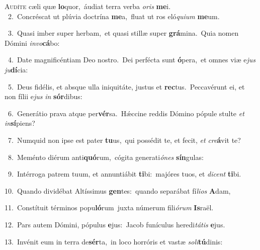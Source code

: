 \lettrine{\initial\textcolor{\initialcolor}{A}}{udíte} cæli quæ \textbf{lo}\-quor,~\star áudiat terra verba \textit{o}\-\textit{ris} \textbf{me}\-i.\\
{\numbfont\textcolor{\numbcolor}{~2.}}~Concréscat ut plúvia doctrína \textbf{me}\-a,~\star fluat ut ros eló\-\textit{qui}\-\textit{um} \textbf{me}\-um.\par
{\numbfont\textcolor{\numbcolor}{~3.}}~Quasi imber super herbam,~\dagger et quasi stillæ super \textbf{grá}\-mina.~\star Quia nomen Dómini \textit{in}\-\textit{vo}\textbf{cá}bo:\par
{\numbfont\textcolor{\numbcolor}{~4.}}~Date magnificéntiam Deo nostro.~\dagger Dei perfécta sunt \textbf{ó}\-pera,~\star et omnes viæ e\textit{jus} \textit{ju}\-\textbf{dí}cia:\par
{\numbfont\textcolor{\numbcolor}{~5.}}~Deus fidélis, et absque ulla iniquitáte, justus et \textbf{rec}\-tus.~\star Peccavérunt ei, et non fílii e\textit{jus} \textit{in} \textbf{sór}\-dibus:\par
{\numbfont\textcolor{\numbcolor}{~6.}}~Generátio prava atque per\-\textbf{vér}\-sa.~\star Hǽccine reddis Dómino pópule stulte \textit{et} \textit{in}\-\textbf{sí}piens?\par
{\numbfont\textcolor{\numbcolor}{~7.}}~Numquid non ipse est pater \textbf{tu}\-us,~\star qui possédit te, et fecit, \textit{et} \textit{cre}\-\textbf{á}vit te?\par
{\numbfont\textcolor{\numbcolor}{~8.}}~Meménto diérum anti\-\textbf{quó}\-rum,~\star cógita generati\-\textit{ó}\-\textit{nes} \textbf{sín}\-gulas:\par
{\numbfont\textcolor{\numbcolor}{~9.}}~Intérroga patrem tuum, et annuntiábit \textbf{ti}\-bi:~\star majóres tuos, et \textit{di}\-\textit{cent} \textbf{ti}\-bi.\par
{\numbfont\textcolor{\numbcolor}{10.}}~Quando dividébat Altíssimus \textbf{gen}\-tes:~\star quando separábat fí\-\textit{li}\-\textit{os} \textbf{A}\-dam,\par
{\numbfont\textcolor{\numbcolor}{11.}}~Constítuit términos popu\-\textbf{ló}\-rum~\star juxta númerum fili\-\textit{ó}\-\textit{rum} \textbf{Is}\-raël.\par
{\numbfont\textcolor{\numbcolor}{12.}}~Pars autem Dómini, pópulus \textbf{e}\-jus:~\star Jacob funículus heredi\-\textit{tá}\-\textit{tis} \textbf{e}\-jus.\par
{\numbfont\textcolor{\numbcolor}{13.}}~Invénit eum in terra de\-\textbf{sér}\-ta,~\star in loco horróris et vastæ \textit{so}\-\textit{li}\textbf{tú}dinis:\par
